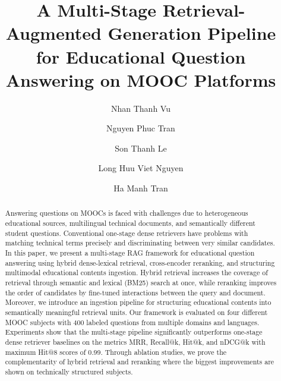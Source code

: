 \documentclass[runningheads]{llncs}
\begin{document}
\title{A Multi-Stage Retrieval-Augmented Generation Pipeline for Educational Question Answering on MOOC Platforms}

\author{Nhan Thanh Vu \and
Nguyen Phuc Tran \and
Son Thanh Le \and
Long Huu Viet Nguyen \and
Ha Manh Tran}



\maketitle

\begin{abstract}
Answering questions on MOOCs is faced with challenges due to heterogeneous educational sources, multilingual technical documents, and semantically different student questions. Conventional one-stage dense retrievers have problems with matching technical terms precisely and discriminating between very similar candidates. In this paper, we present a multi-stage RAG framework for educational question answering using hybrid dense-lexical retrieval, cross-encoder reranking, and structuring multimodal educational contents ingestion. Hybrid retrieval increases the coverage of retrieval through semantic and lexical (BM25) search at once, while reranking improves the order of candidates by fine-tuned interactions between the query and document. Moreover, we introduce an ingestion pipeline for structuring educational contents into semantically meaningful retrieval units. Our framework is evaluated on four different MOOC subjects with 400 labeled questions from multiple domains and languages. Experiments show that the multi-stage pipeline significantly outperforms one-stage dense retriever baselines on the metrics MRR, Recall@k, Hit@k, and nDCG@k with maximum Hit@8 scores of 0.99. Through ablation studies, we prove the complementarity of hybrid retrieval and reranking where the biggest improvements are shown on technically structured subjects.

\end{abstract}
\end{document}
